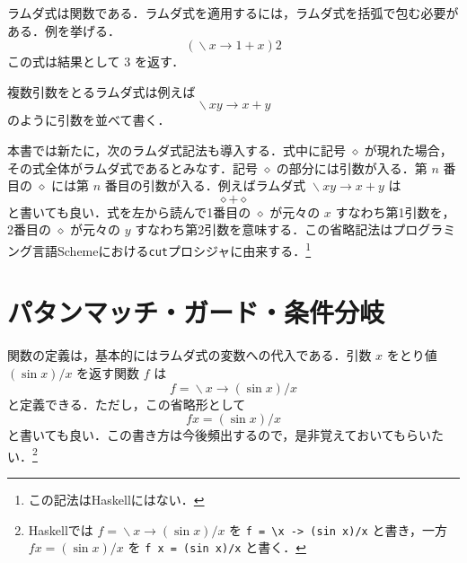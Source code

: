\documentclass[a4paper,twocolumn]{jsbook}
\newcommand{\programminglanguage}[1]{\textsf{#1}}
\newcommand{\haskell}{\programminglanguage{Haskell}}
\newcommand{\python}{\programminglanguage{Python}}
\newcommand{\scheme}{\programminglanguage{Scheme}}
\newcommand{\code}[1]{\texttt{#1}}
\newenvironment{pythoncode}{\begin{itembox}[r]{\python}}{\end{itembox}}
\newcommand{\mAnonParam}{\diamond}
\DeclareMathOperator{\mLambda}{\backslash}
\DeclareMathOperator{\mLambdaArrow}{\rightarrow}
\newcommand{\mLambdaExp}[2]{\mLambda{#1}\mLambdaArrow{#2}}
\begin{document}
ラムダ式は関数である．ラムダ式を適用するには，ラムダ式を括弧で包む必要がある．例を挙げる．
\begin{equation}
(\mLambdaExp{x}{1+x})2
\end{equation}
この式は結果として $3$ を返す．

複数引数をとるラムダ式は例えば
\begin{equation}
\mLambdaExp{xy}{x+y}
\end{equation}
のように引数を並べて書く．

本書では新たに，次のラムダ式記法も導入する．式中に記号 $\mAnonParam$ が現れた場合，その式全体がラムダ式であるとみなす．記号 $\mAnonParam$ の部分には引数が入る．第 $n$ 番目の $\mAnonParam$ には第 $n$ 番目の引数が入る．例えばラムダ式 $\mLambdaExp{xy}{x+y}$ は
\begin{equation}
\mAnonParam+\mAnonParam
\end{equation}
と書いても良い．式を左から読んで1番目の $\mAnonParam$ が元々の $x$ すなわち第1引数を，2番目の $\mAnonParam$ が元々の $y$ すなわち第2引数を意味する．この省略記法はプログラミング言語\scheme における\code{cut}プロシジャに由来する．\footnote{この記法は\haskell にはない．}

\section{パタンマッチ・ガード・条件分岐}

関数の定義は，基本的にはラムダ式の変数への代入である．引数 $x$ をとり値 $(\sin x)/x$ を返す関数 $f$ は
\begin{equation}
f=\mLambdaExp{x}{(\sin x)/x}
\end{equation}
と定義できる．ただし，この省略形として
\begin{equation}
fx=(\sin x)/x
\end{equation}
と書いても良い．この書き方は今後頻出するので，是非覚えておいてもらいたい．\footnote{\haskell では $f=\mLambdaExp{x}{(\sin x)/x}$ を \code{f = \textbackslash x -> (sin x)/x} と書き，一方 $fx=(\sin x)/x$ を \code{f x = (sin x)/x} と書く．}

\end{document}
